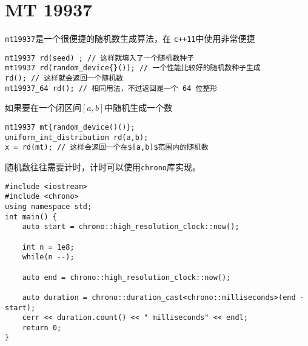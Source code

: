 \section{MT 19937}

\verb|mt19937|是一个很便捷的随机数生成算法，在 \verb|c++11|中使用非常便捷
\begin{lstlisting}
mt19937 rd(seed) ; // 这样就填入了一个随机数种子
mt19937 rd(random_device{}()); // 一个性能比较好的随机数种子生成
rd(); // 这样就会返回一个随机数
mt19937_64 rd(); // 相同用法，不过返回是一个 64 位整形
\end{lstlisting}

如果要在一个闭区间$[a,b]$中随机生成一个数
\begin{lstlisting}
mt19937 mt{random_device()()};
uniform_int_distribution rd(a,b);
x = rd(mt); // 这样会返回一个在$[a,b]$范围内的随机数
\end{lstlisting}

随机数往往需要计时，计时可以使用\verb|chrono|库实现。
\begin{lstlisting}
#include <iostream>
#include <chrono>
using namespace std;
int main() {
    auto start = chrono::high_resolution_clock::now();

    int n = 1e8;
    while(n --);

    auto end = chrono::high_resolution_clock::now();

    auto duration = chrono::duration_cast<chrono::milliseconds>(end - start);
    cerr << duration.count() << " milliseconds" << endl;
    return 0;
}
\end{lstlisting}